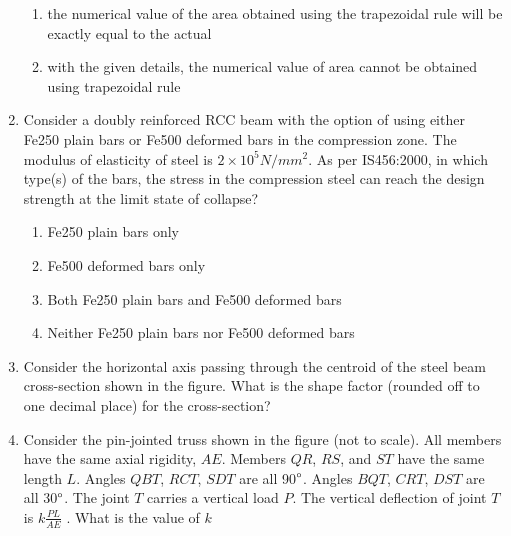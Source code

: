 \documentclass[journal,12pt,onecolumn]{IEEEtran}
\theoremstyle{remark}
\begin{document}
\begin{enumerate}
\begin{enumerate}
\item the numerical value of the area obtained using the trapezoidal rule will be exactly equal to the actual
\item with the given details, the numerical value of area cannot be obtained using trapezoidal rule
\end{enumerate}
\item Consider a doubly reinforced RCC beam with the option of using either Fe250 plain bars or Fe500 deformed bars in the compression zone. The modulus of elasticity of steel is $2 \times 10^5 N/mm^2$. As per IS456:2000, in which type(s) of the bars, the stress in the compression steel can reach the design strength  at the limit
state of collapse?
\begin{enumerate}
\item Fe250 plain bars only
\item Fe500 deformed bars only
\item Both Fe250 plain bars and Fe500 deformed bars
\item Neither Fe250 plain bars nor Fe500 deformed bars
\end{enumerate}
\item Consider the horizontal axis passing through the centroid of the steel beam cross-section shown in the figure. What is the shape factor (rounded off to one decimal place) for the cross-section?
\begin{figure}[H]
    \centering
    
 \end{figure}
\begin{enumerate}
\end{enumerate}
\item Consider the pin-jointed truss shown in the figure (not to scale). All members have the same axial rigidity, $AE$. Members $QR$, $RS$, and $ST$ have the same length $L$. Angles $QBT$, $RCT$, $SDT$ are all 90$\degree$. Angles $BQT$, $CRT$, $DST$ are all 30$\degree$. The joint $T$ carries a vertical load $P$. The vertical deflection of joint $T$ is $k\frac{PL}{AE}$ . What is the value of $k$
\begin{figure}[H]
    \centering
    
 \end{figure}
 \begin{enumerate}
\end{enumerate}
\end{enumerate}
\end{document}
